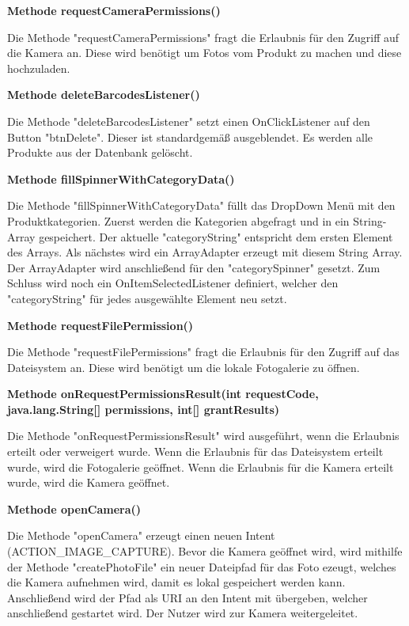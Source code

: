 \documentclass{scrartcl}
\begin{document}
\noindent\textbf{Methode requestCameraPermissions()} 

\noindent Die Methode "requestCameraPermissions" fragt die Erlaubnis für den Zugriff auf die Kamera an. Diese wird benötigt um Fotos vom Produkt zu machen und diese hochzuladen. \newline

\noindent\textbf{Methode deleteBarcodesListener()} 

\noindent Die Methode "deleteBarcodesListener" setzt einen OnClickListener auf den Button "btnDelete". Dieser ist standardgemäß ausgeblendet. Es werden alle Produkte aus der Datenbank gelöscht. \newline 

\noindent\textbf{Methode fillSpinnerWithCategoryData()} 

\noindent Die Methode "fillSpinnerWithCategoryData" füllt das DropDown Menü mit den Produktkategorien. Zuerst werden die Kategorien abgefragt und in ein String-Array gespeichert. Der aktuelle "categoryString" entspricht dem ersten Element des Arrays. Als nächstes wird ein ArrayAdapter erzeugt mit diesem String Array. Der ArrayAdapter wird anschließend für den "categorySpinner" gesetzt. Zum Schluss wird noch ein OnItemSelectedListener definiert, welcher den "categoryString" für jedes ausgewählte Element neu setzt. \newline

\noindent\textbf{Methode requestFilePermission()} 

\noindent Die Methode "requestFilePermissions" fragt die Erlaubnis für den Zugriff auf das Dateisystem an. Diese wird benötigt um die lokale Fotogalerie zu öffnen. \newline

\noindent\textbf{Methode onRequestPermissionsResult(int requestCode, \newline           java.lang.String[] permissions, int[] grantResults)} 

\noindent Die Methode "onRequestPermissionsResult" wird ausgeführt, wenn die Erlaubnis erteilt oder verweigert wurde. Wenn die Erlaubnis für das Dateisystem erteilt wurde, wird die Fotogalerie geöffnet. Wenn die Erlaubnis für die Kamera erteilt wurde, wird die Kamera geöffnet. \newline 

\noindent\textbf{Methode openCamera()} 

\noindent Die Methode "openCamera" erzeugt einen neuen Intent (ACTION\_IMAGE\_CAPTURE). Bevor die Kamera geöffnet wird, wird mithilfe der Methode "createPhotoFile" ein neuer Dateipfad für das Foto ezeugt, welches die Kamera aufnehmen wird, damit es lokal gespeichert werden kann. Anschließend wird der Pfad als URI an den Intent mit übergeben, welcher anschließend gestartet wird. Der Nutzer wird zur Kamera weitergeleitet. \newline
\end{document}
